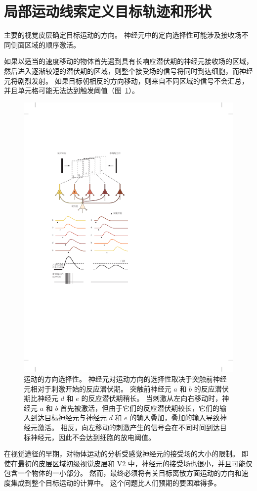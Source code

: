 \section{局部运动线索定义目标轨迹和形状}

主要的视觉皮层确定目标运动的方向。
神经元中的定向选择性可能涉及接收场不同侧面区域的顺序激活。


如果以适当的速度移动的物体首先遇到具有长响应潜伏期的神经元接收场的区域，然后进入逐渐较短的潜伏期的区域，则整个接受场的信号将同时到达细胞，而神经元将剧烈发射。
如果目标朝相反的方向移动，则来自不同区域的信号不会汇总，并且单元格可能无法达到触发阈值（图~\ref{fig:23_10}）。


\begin{figure}[htbp]
	\centering
	\includegraphics[width=0.7\linewidth]{chap23/fig_23_10}
	\caption{运动的方向选择性。
		神经元对运动方向的选择性取决于突触前神经元相对于刺激开始的反应潜伏期。
		突触前神经元 $a$ 和 $b$ 的反应潜伏期比神经元 $d$ 和 $e$ 的反应潜伏期稍长。
		当刺激从左向右移动时，神经元 $a$ 和 $b$ 首先被激活，但由于它们的反应潜伏期较长，它们的输入到达目标神经元与神经元 $d$ 和 $e$ 的输入叠加，叠加的输入导致神经元激活。
		相反，向左移动的刺激产生的信号会在不同时间到达目标神经元，因此不会达到细胞的放电阈值\cite{priebe2008inhibition}。}
	\label{fig:23_10}
\end{figure}


在视觉途径的早期，对物体运动的分析受感觉神经元的接受场的大小的限制。 
即使在最初的皮层区域初级视觉皮层和 V2 中，神经元的接受场也很小，并且可能仅包含一个物体的一小部分。 
然而，最终必须将有关目标离散方面运动的方向和速度集成到整个目标运动的计算中。 
这个问题比人们预期的要困难得多。


